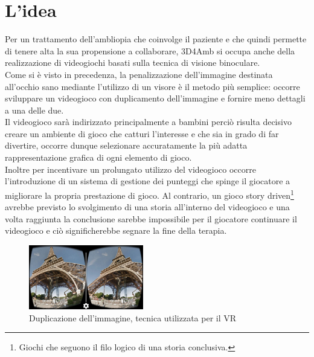 \documentclass[12pt,a4paper,openright,twoside]{book}
\begin{document}
	\section{L'idea}
	Per un trattamento dell'ambliopia che coinvolge il paziente e che quindi permette di tenere alta la sua propensione a collaborare, 3D4Amb si occupa anche della realizzazione di videogiochi basati sulla tecnica di visione binoculare.\\
	Come si è visto in precedenza, la penalizzazione dell'immagine destinata all'occhio sano mediante l'utilizzo di un visore è il metodo più semplice: occorre sviluppare un videogioco con duplicamento dell'immagine e fornire meno dettagli a una delle due.\\
	Il videogioco sarà indirizzato principalmente a bambini perciò risulta decisivo creare un ambiente di gioco che catturi l'interesse e che sia in grado di far divertire, occorre dunque selezionare accuratamente la più adatta rappresentazione grafica di ogni elemento di gioco.\\
	Inoltre per incentivare un prolungato utilizzo del videogioco occorre l'introduzione di un sistema di gestione dei punteggi che spinge il giocatore a migliorare la propria prestazione di gioco. Al contrario, un gioco story driven\footnote{Giochi che seguono il filo logico di una storia conclusiva.} avrebbe previsto lo svolgimento di una storia all'interno del videogioco e una volta raggiunta la conclusione sarebbe impossibile per il giocatore continuare il videogioco e ciò significherebbe segnare la fine della terapia.\\
		\begin{figure}[h]
		\centering   	
		\includegraphics[width=50mm]{doubleimg.jpg}
		\caption{Duplicazione dell'immagine, tecnica utilizzata per il VR}
		\label{fig:doubleimg}
     	\end{figure}
     
\end{document}
